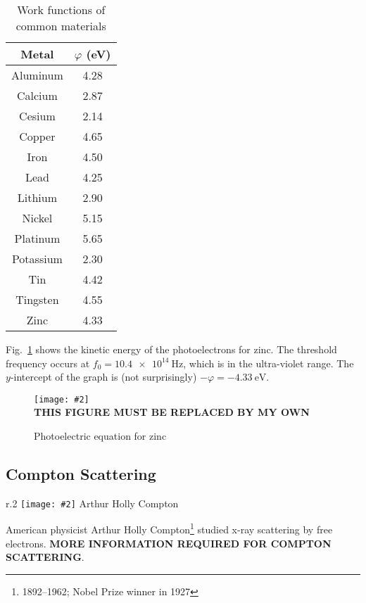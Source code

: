 \documentclass[11pt]{article}
\newcommand{\pic}[2]{\texttt{[image: \#2]}}
\begin{document}
\begin{table}[ht]
  \centering
  \begin{tabular}{|c|c|}
    \rowcolor{pink}
    \hline
    \textbf{Metal} & $\varphi$ (\si{\electronvolt}) \\
    \hline
    Aluminum  & 4.28 \\ \hline
    Calcium   & 2.87 \\ \hline
    Cesium    & 2.14 \\ \hline
    Copper    & 4.65 \\ \hline
    Iron      & 4.50 \\ \hline
    Lead      & 4.25 \\ \hline
    Lithium   & 2.90 \\ \hline
    Nickel    & 5.15 \\ \hline
    Platinum  & 5.65 \\ \hline
    Potassium & 2.30 \\ \hline
    Tin       & 4.42 \\ \hline
    Tingsten  & 4.55 \\ \hline
    Zinc      & 4.33 \\ \hline
  \end{tabular}
  \caption{Work functions of common materials}
  \label{tabl:varphi}
\end{table}

Fig.~\ref{fig:zinc} shows the kinetic energy of the photoelectrons for zinc.
The threshold frequency occurs at $f_0=\SI{10.4e14}{\hertz}$, which is in the
ultra-violet range. The $y$-intercept of the graph is (not surprisingly)
$-\varphi=\SI{-4.33}{\electronvolt}$.
\begin{figure}[ht]
  \centering
  \pic{.4}{../550px-Photoelectric_effect_diagram.png}\\
  \textbf{THIS FIGURE MUST BE REPLACED BY MY OWN}
  \caption{Photoelectric equation for zinc}
  \label{fig:zinc}
\end{figure}



\subsection{Compton Scattering}

\begin{wrapfigure}{r}{.2\textwidth}
  \centering
  \pic{.2}{Arthur_Compton_1927.jpg}
  Arthur Holly Compton
\end{wrapfigure}
American physicist Arthur Holly Compton\footnote{1892--1962; Nobel Prize
  winner in 1927} studied x-ray scattering by free electrons.
\textbf{MORE INFORMATION REQUIRED FOR COMPTON SCATTERING}.
\end{document}
